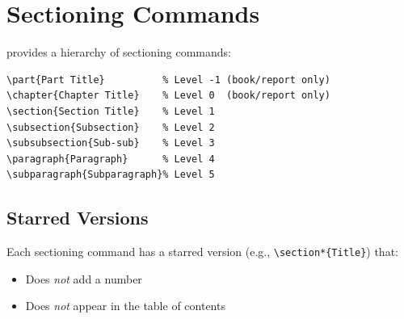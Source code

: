 \section{Sectioning Commands}

\latex{} provides a hierarchy of sectioning commands:

\begin{lstlisting}[language={[LaTeX]TeX}, caption=Sectioning hierarchy]
\part{Part Title}          % Level -1 (book/report only)
\chapter{Chapter Title}    % Level 0  (book/report only)
\section{Section Title}    % Level 1
\subsection{Subsection}    % Level 2
\subsubsection{Sub-sub}    % Level 3
\paragraph{Paragraph}      % Level 4
\subparagraph{Subparagraph}% Level 5
\end{lstlisting}

\subsection{Starred Versions}

Each sectioning command has a starred version (e.g., \verb|\section*{Title}|) that:
\begin{itemize}
    \item Does \emph{not} add a number
    \item Does \emph{not} appear in the table of contents
\end{itemize}

